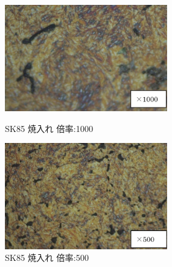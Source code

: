 \documentclass[10pt，a4j]{jsarticle}
\begin{document}
  \begin{figure}[htbp]
    \begin{minipage}{0.5\hsize}
      \begin{center}
        \includegraphics[width=7cm]{../img/SK85_yakiire_1000.png}
        \caption{SK85 焼入れ 倍率:1000}
      \end{center}
    \end{minipage}
    \begin{minipage}{0.5\hsize}
      \begin{center}
        \includegraphics[width=7cm]{../img/SK85_yakiire_500.png}
        \caption{SK85 焼入れ 倍率:500}
      \end{center}
    \end{minipage}
  \end{figure}
\end{document}
